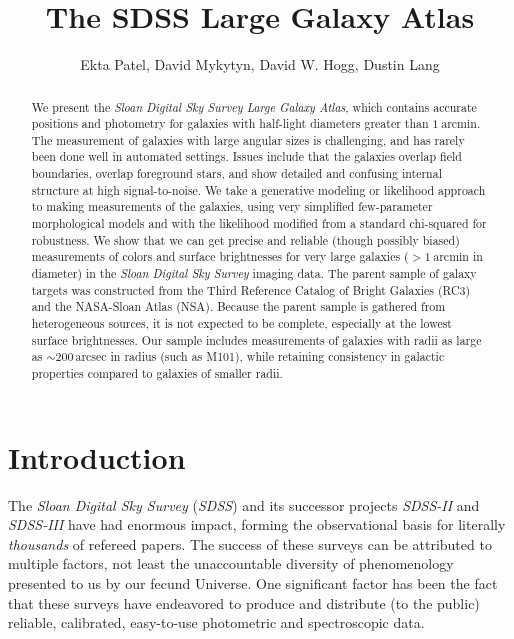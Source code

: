\documentclass[12pt,preprint,pdftex]{aastex}
\newcounter{address}
\newcommand{\project}[1]{\textsl{#1}}
\newcommand{\units}[1]{\mathrm{#1}}
\renewcommand{\arcmin}{\units{arcmin}}
\renewcommand{\arcsec}{\units{arcsec}}
\begin{document}
\title{
       The SDSS Large Galaxy Atlas
      }
\author{
        Ekta Patel\altaffilmark{\ref{CCPP}},
        David Mykytyn\altaffilmark{\ref{CCPP}},
        David W. Hogg\altaffilmark{\ref{CCPP},\ref{MPIA},\ref{email}},
        Dustin Lang\altaffilmark{\ref{CMU}}
       }
\setcounter{address}{1}

\begin{abstract}
We present the \project{Sloan Digital Sky Survey Large Galaxy Atlas},
which contains accurate positions and photometry for galaxies with
half-light diameters greater than $1~\arcmin$. The measurement of
galaxies with large angular sizes is challenging, and has rarely been
done well in automated settings.  Issues include that the galaxies
overlap field boundaries, overlap foreground stars, and show detailed
and confusing internal structure at high signal-to-noise.  We take a
generative modeling or likelihood approach to making measurements of
the galaxies, using very simplified few-parameter morphological models
and with the likelihood modified from a standard chi-squared for
robustness.  We show that we can get precise and reliable (though
possibly biased) measurements of colors and surface brightnesses for
very large galaxies ($>1~\arcmin$ in diameter) in the \project{Sloan
  Digital Sky Survey} imaging data. The parent sample of galaxy
targets was constructed from the Third Reference Catalog of Bright
Galaxies (RC3) and the NASA-Sloan Atlas (NSA). Because the parent
sample is gathered from heterogeneous sources, it is not expected to
be complete, especially at the lowest surface brightnesses.  Our
sample includes measurements of galaxies with radii as large as $\sim
200\,\arcsec$ in radius (such as M101), while
retaining consistency in galactic properties compared to galaxies of
smaller radii.
\end{abstract}

\section{Introduction}
The \project{Sloan Digital Sky Survey} (\project{SDSS}) and its
successor projects \project{SDSS-II} and \project{SDSS-III} have had
enormous impact, forming the observational basis for literally
\emph{thousands} of refereed papers.  The success of these surveys can
be attributed to multiple factors, not least the unaccountable
diversity of phenomenology presented to us by our fecund Universe.
One significant factor has been the fact that these surveys have
endeavored to produce and distribute (to the public) reliable,
calibrated, easy-to-use photometric and spectroscopic data.
\end{document}
